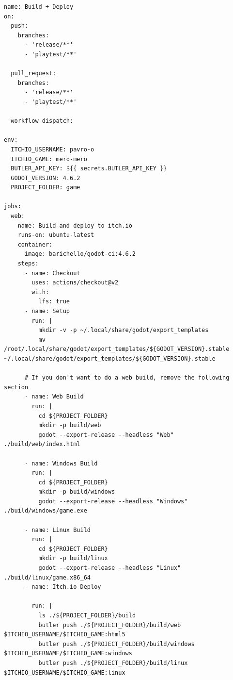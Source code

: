 \begin{verbatim}
name: Build + Deploy
on:
  push:
    branches:
      - 'release/**'
      - 'playtest/**'

  pull_request:
    branches:
      - 'release/**'
      - 'playtest/**'

  workflow_dispatch:

env:
  ITCHIO_USERNAME: pavro-o
  ITCHIO_GAME: mero-mero
  BUTLER_API_KEY: ${{ secrets.BUTLER_API_KEY }}
  GODOT_VERSION: 4.6.2
  PROJECT_FOLDER: game

jobs:
  web:
    name: Build and deploy to itch.io
    runs-on: ubuntu-latest
    container:
      image: barichello/godot-ci:4.6.2
    steps:
      - name: Checkout
        uses: actions/checkout@v2
        with:
          lfs: true
      - name: Setup
        run: |
          mkdir -v -p ~/.local/share/godot/export_templates
          mv /root/.local/share/godot/export_templates/${GODOT_VERSION}.stable ~/.local/share/godot/export_templates/${GODOT_VERSION}.stable
      
      # If you don't want to do a web build, remove the following section
      - name: Web Build
        run: |
          cd ${PROJECT_FOLDER}
          mkdir -p build/web
          godot --export-release --headless "Web" ./build/web/index.html
      
      - name: Windows Build
        run: |
          cd ${PROJECT_FOLDER}
          mkdir -p build/windows
          godot --export-release --headless "Windows" ./build/windows/game.exe

      - name: Linux Build
        run: |
          cd ${PROJECT_FOLDER}
          mkdir -p build/linux
          godot --export-release --headless "Linux" ./build/linux/game.x86_64
      - name: Itch.io Deploy

        run: |
          ls ./${PROJECT_FOLDER}/build
          butler push ./${PROJECT_FOLDER}/build/web $ITCHIO_USERNAME/$ITCHIO_GAME:html5
          butler push ./${PROJECT_FOLDER}/build/windows $ITCHIO_USERNAME/$ITCHIO_GAME:windows
          butler push ./${PROJECT_FOLDER}/build/linux $ITCHIO_USERNAME/$ITCHIO_GAME:linux
\end{verbatim}